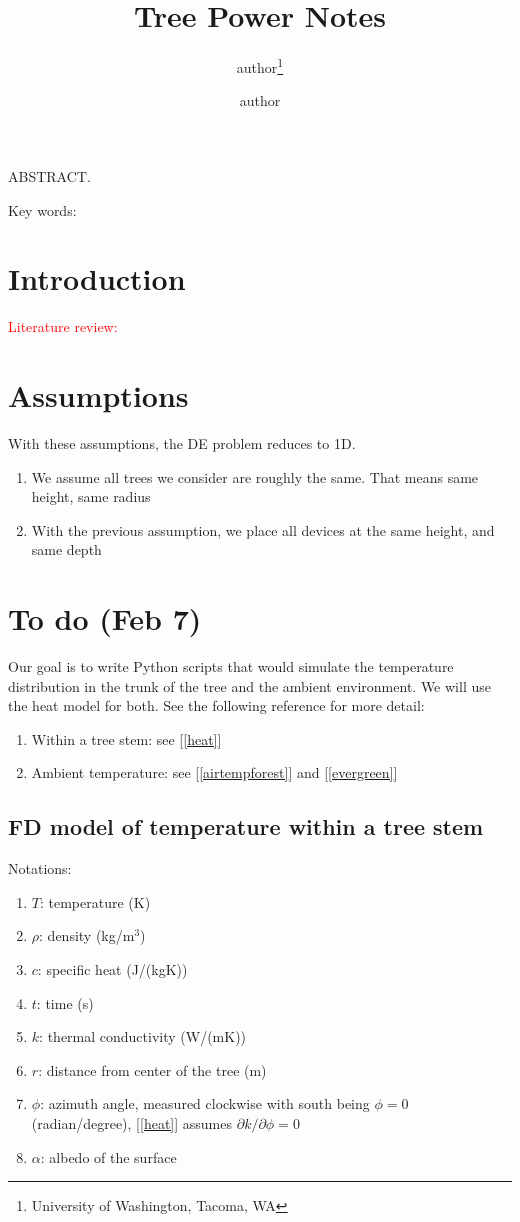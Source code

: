 \documentclass[12pt]{article}
\title{Tree Power Notes}
\author{author\thanks{University of Washington, Tacoma, WA} %
\and author\footnotemark[1]}
\begin{document}
\maketitle

\noindent ABSTRACT. 

\vspace{1cm}

\noindent Key words: 


\section*{Introduction}  \textcolor{red}{Literature review:}



\section{Assumptions}

With these assumptions, the DE problem reduces to 1D.
\begin{enumerate}
\item We assume all trees we consider are roughly the same. That means same height, same radius
\item With the previous assumption, we place all devices at the same height, and same depth
\end{enumerate}

\section{To do (Feb 7)}
Our goal is to write Python scripts that would simulate the temperature distribution in the trunk of the tree and the ambient environment. We will use the heat model for both. See the following reference for more detail:
\begin{enumerate}
\item Within a tree stem: see [\ref{heat}]
\item Ambient temperature: see [\ref{airtempforest}] and [\ref{evergreen}]
\end{enumerate}

\subsection{FD model of temperature within a tree stem}

Notations: 
\begin{enumerate}
\item $T$: temperature (K)
\item $\rho$: density (kg/m$^3$)
\item $c$: specific heat (J/(kgK))
\item $t$: time (s)
\item $k$: thermal conductivity (W/(mK))
\item $r$: distance from center of the tree (m)
\item $\phi$: azimuth angle, measured clockwise with south being $\phi=0$ (radian/degree), [\ref{heat}] assumes $\partial k/\partial \phi=0$
\item $\alpha$: albedo of the surface
\end{enumerate}
\end{document}

